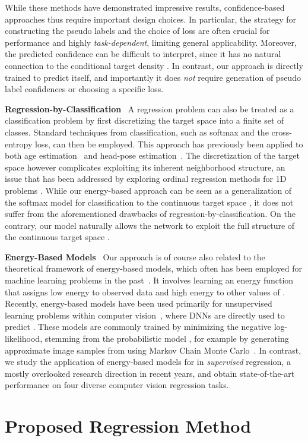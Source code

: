 \documentclass[runningheads]{llncs}
\newcommand{\parsection}[1]{\noindent\textbf{#1}~ }
\begin{document}
While these methods have demonstrated impressive results, confidence-based approaches thus require important design choices. In particular, the strategy for constructing the pseudo labels  and the choice of loss  are often crucial for performance and highly \emph{task-dependent}, limiting general applicability. Moreover, the predicted confidence  can be difficult to interpret, since it has no natural connection to the conditional target density . In contrast, our approach is directly trained to predict  itself, and importantly it does \textit{not} require generation of pseudo label confidences or choosing a specific loss.






\parsection{Regression-by-Classification}
A regression problem can also be treated as a classification problem by first discretizing the target space  into a finite set of  classes. Standard techniques from classification, such as softmax and the cross-entropy loss, can then be employed. This approach has previously been applied to both age estimation~\cite{rothe2016deep,pan2018mean,yang2018ssr} and head-pose estimation~\cite{ruiz2018fine,yang2019fsa}. The discretization of the target space  however complicates exploiting its inherent neighborhood structure, an issue that has been addressed by exploring ordinal regression methods for 1D problems \cite{cao2019consistent,Diaz_2019_CVPR}. While our energy-based approach can be seen as a generalization of the softmax model for classification to the continuous target space , it does not suffer from the aforementioned drawbacks of regression-by-classification. On the contrary, our model naturally allows the network to exploit the full structure of the continuous target space .





\parsection{Energy-Based Models}
Our approach is of course also related to the theoretical framework of energy-based models, which often has been employed for machine learning problems in the past~\cite{mnih2005learning,hinton2006unsupervised,lecun2006tutorial}. It involves learning an energy function  that assigns low energy to observed data  and high energy to other values of . Recently, energy-based models have been used primarily for unsupervised learning problems within computer vision~\cite{xie2016theory,gao2018learning,du2019implicit,lawson2019energy,nijkamp2019anatomy}, where DNNs are directly used to predict . These models are commonly trained by minimizing the negative log-likelihood, stemming from the probabilistic model , for example by generating approximate image samples from  using Markov Chain Monte Carlo~\cite{gao2018learning,du2019implicit,nijkamp2019anatomy}. In contrast, we study the application of energy-based models for  in \emph{supervised} regression, a mostly overlooked research direction in recent years, and obtain state-of-the-art performance on four diverse computer vision regression tasks. \section{Proposed Regression Method}
\label{section:DCTDs}
\end{document}
